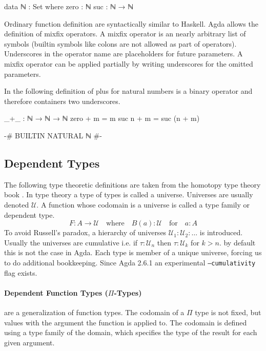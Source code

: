 \documentclass[10pt,a4paper,twoside]{report}
\begin{document}
\begin{code}
data ℕ : Set where
  zero  : ℕ
  suc   : ℕ → ℕ
\end{code}
Ordinary function definition are syntactically similar to Haskell.
Agda allows the definition of mixfix operators.
A mixfix operator is an nearly arbitrary list of symbols (builtin symbols like
colons are not allowed as part of operators).
Underscores in the operator name are placeholders for future parameters.
A mixfix operator can be applied partially by writing underscores for the
omitted parameters.

In the following definition of plus for natural numbers \AgdaFunction{+} is a
binary operator and therefore containers two underscores.

\begin{code}
_+_ : ℕ → ℕ → ℕ
zero   + m = m
suc n  + m = suc (n + m)
\end{code}
\begin{code}[hide]
{-# BUILTIN NATURAL ℕ #-}
\end{code}

\subsection{Dependent Types}
The following type theoretic definitions are taken from the homotopy type theory
book \cite{hottbook}.
In type theory a type of types is called a universe.
Universes are usually denoted $\mathcal{U}$.
A function whose codomain is a universe is called a type family or dependent
type.
$$
F : A \rightarrow \mathcal{U} \quad\text{where}\quad B(a) : \mathcal{U}
\quad\text{for}\quad a : A
$$
To avoid Russell's paradox, a hierarchy of universes $\mathcal{U}_1 :
\mathcal{U}_2 : \dots$ is introduced.
Usually the universes are cumulative i.e. if $\tau : \mathcal{U}_n$ then
$\tau : \mathcal{U}_k$ for $k>n$.
by default this is not the case in Agda.
Each type is member of a unique universe, forcing us to do additional
bookkeeping.
Since Agda 2.6.1 an experimental \texttt{--cumulativity} flag exists.

\paragraph{Dependent Function Types ($\Pi$-Types)} are a generalization of
function types.
The codomain of a $\Pi$ type is not fixed, but values with the argument the
function is applied to.
The codomain is defined using a type family of the domain, which specifies the
type of the result for each given argument.
\end{document}
